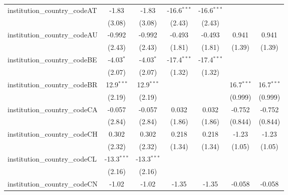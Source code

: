\begin{tabular}{lcccccc}
   institution\_country\_codeAT          & -1.83         & -1.83         & -16.6$^{***}$ & -16.6$^{***}$ &               &   \\   
                                         & (3.08)        & (3.08)        & (2.43)        & (2.43)        &               &   \\   
   institution\_country\_codeAU          & -0.992        & -0.992        & -0.493        & -0.493        & 0.941         & 0.941\\   
                                         & (2.43)        & (2.43)        & (1.81)        & (1.81)        & (1.39)        & (1.39)\\   
   institution\_country\_codeBE          & -4.03$^{*}$   & -4.03$^{*}$   & -17.4$^{***}$ & -17.4$^{***}$ &               &   \\   
                                         & (2.07)        & (2.07)        & (1.32)        & (1.32)        &               &   \\   
   institution\_country\_codeBR          & 12.9$^{***}$  & 12.9$^{***}$  &               &               & 16.7$^{***}$  & 16.7$^{***}$\\   
                                         & (2.19)        & (2.19)        &               &               & (0.999)       & (0.999)\\   
   institution\_country\_codeCA          & -0.057        & -0.057        & 0.032         & 0.032         & -0.752        & -0.752\\   
                                         & (2.84)        & (2.84)        & (1.86)        & (1.86)        & (0.844)       & (0.844)\\   
   institution\_country\_codeCH          & 0.302         & 0.302         & 0.218         & 0.218         & -1.23         & -1.23\\   
                                         & (2.32)        & (2.32)        & (1.34)        & (1.34)        & (1.05)        & (1.05)\\   
   institution\_country\_codeCL          & -13.3$^{***}$ & -13.3$^{***}$ &               &               &               &   \\   
                                         & (2.16)        & (2.16)        &               &               &               &   \\   
   institution\_country\_codeCN          & -1.02         & -1.02         & -1.35         & -1.35         & -0.058        & -0.058\\   

\end{tabular}

